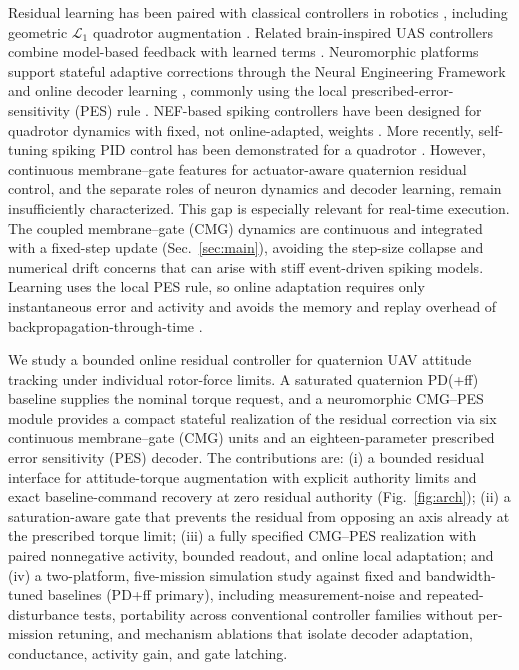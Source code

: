 \documentclass[letterpaper, 10 pt, conference]{ieeeconf}
\begin{document}
Residual learning has been paired with classical controllers in robotics \cite{johannink2019}, including geometric $\mathcal L_1$ quadrotor augmentation \cite{wu2025l1quad}. Related brain-inspired UAS controllers combine model-based feedback with learned terms \cite{rubioscola2023limbic,rubioscola2021mambo}. Neuromorphic platforms support stateful adaptive corrections through the Neural Engineering Framework and online decoder learning \cite{eliasmith2004neuraleng,bekolay2014nengo}, commonly using the local prescribed-error-sensitivity (PES) rule \cite{voelker2015pes}. NEF-based spiking controllers have been designed for quadrotor dynamics with fixed, not online-adapted, weights \cite{garciaalcantara2024snnuas}. More recently, self-tuning spiking PID control has been demonstrated for a quadrotor \cite{olivares2026selftuning}. However, continuous membrane--gate features for actuator-aware quaternion residual control, and the separate roles of neuron dynamics and decoder learning, remain insufficiently characterized.
%
This gap is especially relevant for real-time execution. The coupled membrane--gate (CMG) dynamics are continuous and integrated with a fixed-step update (Sec.~\ref{sec:main}), avoiding the step-size collapse and numerical drift concerns that can arise with stiff event-driven spiking models. Learning uses the local PES rule, so online adaptation requires only instantaneous error and activity and avoids the memory and replay overhead of backpropagation-through-time \cite{voelker2015pes,bellec2020eprop}.

We study a bounded online residual controller for quaternion UAV attitude tracking under individual rotor-force limits. A saturated quaternion PD(+ff) baseline supplies the nominal torque request, and a neuromorphic CMG--PES module provides a compact stateful realization of the residual correction via six continuous membrane--gate (CMG) units and an eighteen-parameter prescribed error sensitivity (PES) decoder.
The contributions are: (i) a bounded residual interface for attitude-torque augmentation with explicit authority limits and exact baseline-command recovery at zero residual authority (Fig.~\ref{fig:arch}); (ii) a saturation-aware gate that prevents the residual from opposing an axis already at the prescribed torque limit; (iii) a fully specified CMG--PES realization with paired nonnegative activity, bounded readout, and online local adaptation; and (iv) a two-platform, five-mission simulation study against fixed and bandwidth-tuned baselines (PD+ff primary), including measurement-noise and repeated-disturbance tests, portability across conventional controller families without per-mission retuning, and mechanism ablations that isolate decoder adaptation, conductance, activity gain, and gate latching.
\end{document}
